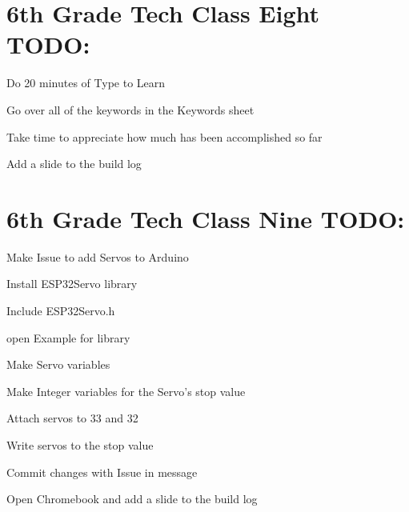 \documentclass{article}
\begin{document}
\section{6th Grade Tech Class Eight TODO:}
\begin{todolist}
	\item Do 20 minutes of Type to Learn
	\item Go over all of the keywords in the Keywords sheet
	\item Take time to appreciate how much has been accomplished so far
	\item Add a slide to the build log
\end{todolist}
\newpage

\section{6th Grade Tech Class Nine TODO:}
\begin{todolist}
	\item Make Issue to add Servos to Arduino
	\item Install ESP32Servo library
	\item Include ESP32Servo.h
	\item open Example for library
	\item Make Servo variables
	\item Make Integer variables for the Servo's stop value
	\item Attach servos to 33 and 32
	\item Write servos to the stop value
	\item Commit changes with Issue in message
	\item Open Chromebook and add a slide to the build log
\end{todolist}
\end{document}
